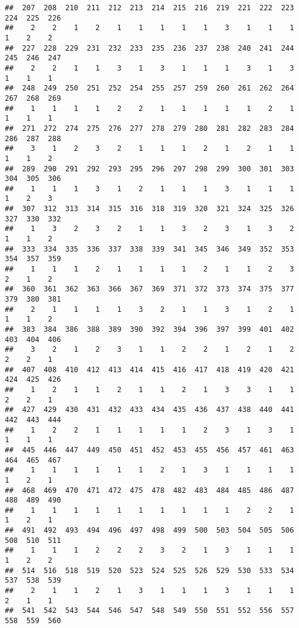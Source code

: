 \documentclass[
]{article}
\begin{document}
\begin{verbatim}
##  207  208  210  211  212  213  214  215  216  219  221  222  223  224  225  226 
##    2    2    1    2    1    1    1    1    1    3    1    1    1    1    2    2 
##  227  228  229  231  232  233  235  236  237  238  240  241  244  245  246  247 
##    2    2    1    1    3    1    3    1    1    1    3    1    3    1    1    1 
##  248  249  250  251  252  254  255  257  259  260  261  262  264  267  268  269 
##    1    1    1    1    2    2    1    1    1    1    1    2    1    1    1    1 
##  271  272  274  275  276  277  278  279  280  281  282  283  284  286  287  288 
##    3    1    2    3    2    1    1    1    2    1    2    1    1    1    1    2 
##  289  290  291  292  293  295  296  297  298  299  300  301  303  304  305  306 
##    1    1    1    3    1    2    1    1    1    3    1    1    1    1    2    3 
##  307  312  313  314  315  316  318  319  320  321  324  325  326  327  330  332 
##    1    3    2    3    2    1    1    3    2    3    1    3    2    1    1    2 
##  333  334  335  336  337  338  339  341  345  346  349  352  353  354  357  359 
##    1    1    1    2    1    1    1    1    2    1    1    2    3    2    1    2 
##  360  361  362  363  366  367  369  371  372  373  374  375  377  379  380  381 
##    2    1    1    1    1    3    2    1    1    3    1    2    1    1    1    2 
##  383  384  386  388  389  390  392  394  396  397  399  401  402  403  404  406 
##    3    2    1    2    3    1    1    2    2    1    2    1    2    2    2    1 
##  407  408  410  412  413  414  415  416  417  418  419  420  421  424  425  426 
##    1    2    1    1    2    1    1    2    1    3    3    1    1    2    2    1 
##  427  429  430  431  432  433  434  435  436  437  438  440  441  442  443  444 
##    1    2    2    1    1    1    1    1    2    3    1    3    1    1    1    1 
##  445  446  447  449  450  451  452  453  455  456  457  461  463  464  465  467 
##    1    1    1    1    1    1    2    1    3    1    1    1    1    1    2    1 
##  468  469  470  471  472  475  478  482  483  484  485  486  487  488  489  490 
##    1    1    1    1    1    1    1    1    1    1    2    2    1    1    2    1 
##  491  492  493  494  496  497  498  499  500  503  504  505  506  508  510  511 
##    1    1    1    2    2    2    3    2    1    3    1    1    1    1    2    2 
##  514  516  518  519  520  523  524  525  526  529  530  533  534  537  538  539 
##    2    1    1    2    1    3    1    1    1    3    1    1    1    2    1    1 
##  541  542  543  544  546  547  548  549  550  551  552  556  557  558  559  560 

\end{verbatim}
\end{document}
